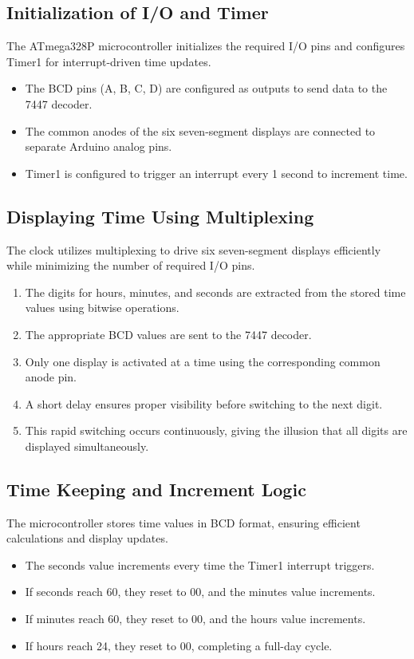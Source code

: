 

\subsection{Initialization of I/O and Timer}
The ATmega328P microcontroller initializes the required I/O pins and configures Timer1 for interrupt-driven time updates.

\begin{itemize}
    \item The BCD pins (A, B, C, D) are configured as outputs to send data to the 7447 decoder.
    \item The common anodes of the six seven-segment displays are connected to separate Arduino analog pins.
    \item Timer1 is configured to trigger an interrupt every 1 second to increment time.
\end{itemize}

\subsection{Displaying Time Using Multiplexing}
The clock utilizes multiplexing to drive six seven-segment displays efficiently while minimizing the number of required I/O pins.

\begin{enumerate}
    \item The digits for hours, minutes, and seconds are extracted from the stored time values using bitwise operations.
    \item The appropriate BCD values are sent to the 7447 decoder.
    \item Only one display is activated at a time using the corresponding common anode pin.
    \item A short delay ensures proper visibility before switching to the next digit.
    \item This rapid switching occurs continuously, giving the illusion that all digits are displayed simultaneously.
\end{enumerate}

\subsection{Time Keeping and Increment Logic}
The microcontroller stores time values in BCD format, ensuring efficient calculations and display updates.

\begin{itemize}
    \item The seconds value increments every time the Timer1 interrupt triggers.
    \item If seconds reach 60, they reset to 00, and the minutes value increments.
    \item If minutes reach 60, they reset to 00, and the hours value increments.
    \item If hours reach 24, they reset to 00, completing a full-day cycle.
\end{itemize}

